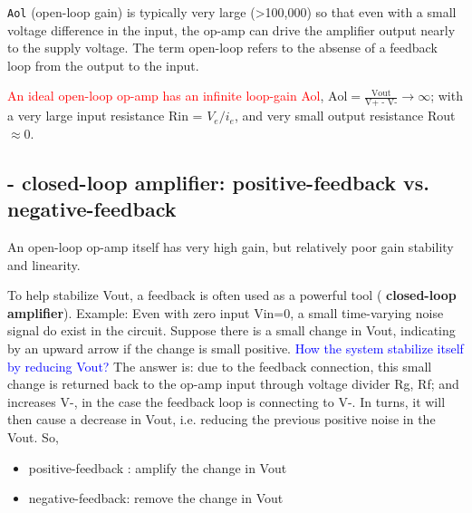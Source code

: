 \begin{mdframed}

\verb!Aol! (open-loop gain) is typically very large (>100,000) so that even
with a small voltage difference in the input, the op-amp can drive the amplifier
output nearly to the supply voltage. The term open-loop refers to the absense of a
feedback loop from the output to the input.
\end{mdframed}

\textcolor{red}{An ideal open-loop op-amp has an infinite loop-gain Aol},
$\text{Aol} = \frac{\text{Vout}}{\text{V+ - V-}}\rightarrow \infty$; with a very
large input resistance Rin = $V_e/i_e$, and very small output resistance Rout
$\approx 0$.


\subsection{- closed-loop amplifier: positive-feedback vs. negative-feedback}
\label{sec:op-amp_closed-loop_negative-feedback}
\label{sec:op-amp_closed-loop_positive-feedback}

An open-loop op-amp itself has very high gain, but relatively poor gain
stability and linearity.

To help stabilize Vout, a feedback is often used as a powerful tool ({\bf
closed-loop amplifier}). Example: Even with zero input Vin=0, a small
time-varying noise signal do exist in the circuit. Suppose there is a small
change in Vout, indicating by an upward arrow if the change is small positive.
\textcolor{blue}{How the system stabilize itself by reducing Vout?}
The answer is: due to the feedback connection, this small change is returned
back to the op-amp input through voltage divider Rg, Rf; and increases V-, in
the case the feedback loop is connecting to V-. In turns, it will then cause a
decrease in Vout, i.e. reducing the previous positive noise in the Vout. So,
\begin{itemize}
  \item positive-feedback : amplify the change in Vout
  \item negative-feedback: remove the change in Vout
\end{itemize}

